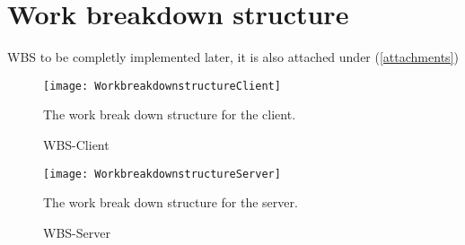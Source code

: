 \section{Work breakdown structure}\label{WBS}
    WBS to be completly implemented later, it is also attached under (\ref{attachments})
    
        \begin{figure}[htb]
            \centering
            \texttt{[image: WorkbreakdownstructureClient]}
            \caption{WBS-Client}
            The work break down structure for the client.
            \label{fig:wbsClient}
        \end{figure}
        
        \begin{figure}[hbt]
            \centering
            \texttt{[image: WorkbreakdownstructureServer]}
            \caption{WBS-Server}
            The work break down structure for the server.
            \label{fig:wbdServer}
        \end{figure}
